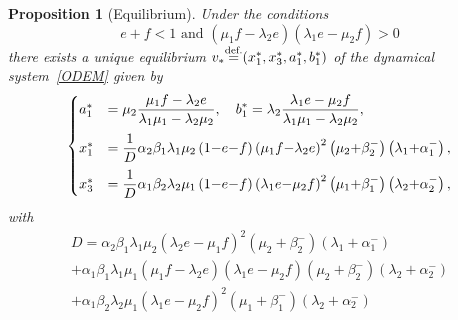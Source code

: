 \documentclass[english]{amsart}
\newcommand\steq[1]{\stackrel{\text{\rm #1.}}{=}}
\newtheorem{proposition}{Proposition}
\numberwithin{proposition}{section}
\begin{document}
\begin{proposition}[Equilibrium]\label{EquiM2M}
Under the conditions
\begin{equation}\label{CondM}
e+f < 1 \text{ and }  \left(\mu_1f-\lambda_2e\right)\left(\lambda_1e-\mu_2f\right) >0 
\end{equation}
  there exists a unique equilibrium $v_*{\steq{def}}(x_1^*,x_3^*,a_1^*,b_1^*)$ of the dynamical system~\eqref{ODEM} given by
\begin{equation}\label{EquiM1M}
  \begin{cases}
    a_1^*& \displaystyle =\mu_2\frac{\mu_1f-\lambda_2 e}{\lambda_1\mu_1-\lambda_2\mu_2},\quad b_1^*=\lambda_2\frac{\lambda_1e-\mu_2f}{\lambda_1\mu_1-\lambda_2\mu_2},\medskip\\
  x_1^*  & \displaystyle=\frac{1}{D}\alpha_2  \beta_1  \lambda_1  \mu_2  \left(1{-}e {-}f\right) \left(\mu_1 f {-}\lambda_2e \right)^{2} \left(\mu_2  {+}\beta_2^{-} \right) \left(\lambda_1  {+}\alpha_1^{-} \right),\medskip\\
x_3^* & \displaystyle=\frac{1}{D}\alpha_1  \beta_2  \lambda_2 \mu_1 \left(1{-}e{-}f\right) \left( \lambda_1e  {-} \mu_2f  \right)^{2}   \left(\mu_1  {+}\beta_1^{-} \right) \left(\lambda_2  {+}\alpha_2^{-} \right),
  \end{cases}
\end{equation}
with
\begin{multline*}
  D=\alpha_2  \beta_1  \lambda_1  \mu_2  \left(\lambda_2e {-}\mu_1 f  \right)^{2} \left(\mu_2  {+}\beta_2^{-} \right) \left(\lambda_1  {+}\alpha_1^{-} \right)\\
  {+}\alpha_1  \beta_1  \lambda_1  \mu_1  \left(  \mu_1 f {-}\lambda_2e   \right) \left(\lambda_1e {-} \mu_2f  \right) \left(\mu_2  {+}\beta_2^{-} \right) \left(\lambda_2  {+}\alpha_2^{-} \right)\\{+}\alpha_1  \beta_2  \lambda_2  \mu_1  \left(\lambda_1e  {-} \mu_2f  \right)^{2} \left(\mu_1  {+}\beta_1^{-} \right) \left(\lambda_2  {+}\alpha_2^{-} \right)
\end{multline*}
\end{proposition}
\end{document}
